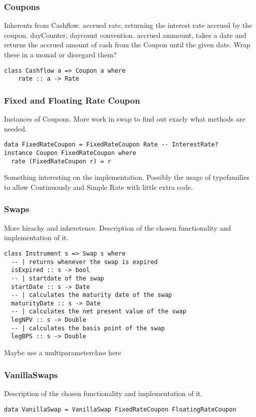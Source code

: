 \documentclass{article}
\begin{document}
\subsubsection{Coupons}
Inherents from Cashflow.
accrued rate, returning the interest rate accrued by the coupon.
dayCounter, daycount convention.
accrued ammount, takes a date and returns the accrued amount of cash from the Coupon until the given date.
Wrap these in a monad or disregard them?

\begin{verbatim}
class Cashflow a => Coupon a where
    rate :: a -> Rate
\end{verbatim}

\subsubsection{Fixed and Floating Rate Coupon}
Instances of Coupons.
More work in swap to find out exacly what methods are needed.

\begin{verbatim}
data FixedRateCoupon = FixedRateCoupon Rate -- InterestRate?
instance Coupon FixedRateCoupon where
  rate (FixedRateCoupon r) = r 
\end{verbatim}
Something interesting on the implementation. Possibly the usage
of typefamilies to allow Continuously and Simple Rate with little
extra code. 

\subsubsection{Swaps}
More hirachy and inheretence.
Description of the chosen functionality and implementation of it.
\begin{verbatim}
class Instrument s => Swap s where
  -- | returns whenever the swap is expired
  isExpired :: s -> bool
  -- | startdate of the swap
  startDate :: s -> Date 
  -- | calculates the maturity date of the swap
  maturityDate :: s -> Date
  -- | calculates the net present value of the swap 
  legNPV :: s -> Double 
  -- | calculates the basis point of the swap
  legBPS :: s -> Double 
\end{verbatim}
Maybe use a multiparameterclass here

\subsubsection{VanillaSwaps}
Description of the chosen functionality and implementation of it.
\begin{verbatim}
data VanillaSwap = VanillaSwap FixedRateCoupon FloatingRateCoupon
\end{verbatim}
\end{document}
